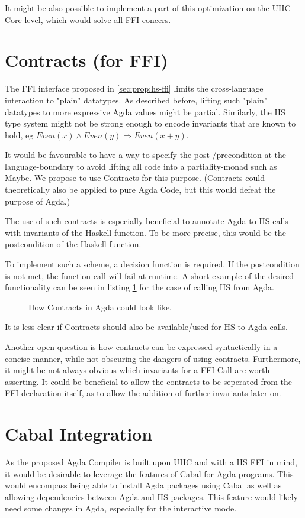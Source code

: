 \documentclass[12pt, a4paper, twoside]{report}
\begin{document}
It might be also possible to implement a part of this optimization on the UHC Core level, which would solve all
FFI concers.

\section{Contracts (for FFI)}
\label{sec:contracts}
The FFI interface proposed in \ref{sec:prop:hs-ffi} limits the cross-language interaction
to "plain" datatypes. As described before, lifting such "plain" datatypes to more expressive
Agda values might be partial. Similarly, the HS type system might not be strong enough
to encode invariants that are known to hold, eg $Even(x) \land Even(y) \Rightarrow Even(x + y)$.

It would be favourable to have a way to specify the post-/precondition at the language-boundary
to avoid lifting all code into a partiality-monad such as Maybe.
We propose to use Contracts for this purpose. (Contracts could
theoretically also be applied to pure Agda Code, but this would defeat the purpose of Agda.)

The use of such contracts is especially beneficial to annotate Agda-to-HS calls with invariants
of the Haskell function. To be more precise, this would be the postcondition of the Haskell function.

To implement such a scheme, a decision function is required. If the postcondition is not met,
the function call will fail at runtime. A short example of the desired functionality can be seen in listing \ref{lst:agda-con-ex}
for the case of calling HS from Agda.


\begin{figure}

\caption{How Contracts in Agda could look like.}
\label{lst:agda-con-ex}
\end{figure}

It is less clear if Contracts should also be available/used for HS-to-Agda calls.

Another open question is how
contracts can be expressed syntactically in a concise manner, while not obscuring the dangers of using contracts.
Furthermore, it might be not always obvious which invariants for a FFI Call are worth asserting. It could be beneficial
to allow the contracts to be seperated from the FFI declaration itself, as to allow the addition of further invariants later on.


\section{Cabal Integration}
As the proposed Agda Compiler is built upon UHC and with a HS FFI in mind, it would be desirable
to leverage the features of Cabal for Agda programs. This would encompass being able
to install Agda packages using Cabal as well as allowing dependencies between Agda and HS packages.
This feature would likely need some changes in Agda, especially
for the interactive mode.
\end{document}
